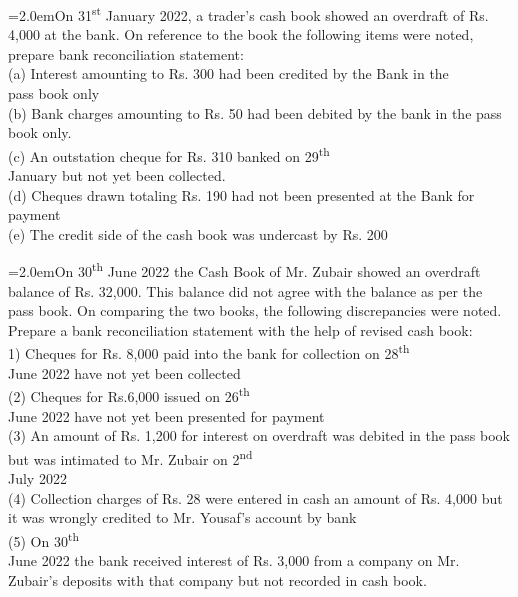 \documentclass[11pt,a4paper]{article}
\newcommand{\lqn}[2]{\Needspace{6\baselineskip}\par\medskip\noindent\hangindent=2.0em\hangafter=1\makebox[2.0em][l]{\textbf{#1.}}#2\par}
\begin{document}
\lqn{75}{On 31\textsuperscript{st} January 2022, a trader's cash book showed an overdraft of Rs. 4,000 at the bank. On reference to the book the following items were noted, prepare bank reconciliation statement:\\
(a) Interest amounting to Rs. 300 had been credited by the Bank in the\\
pass book only\\
(b) Bank charges amounting to Rs. 50 had been debited by the bank in the pass book only.\\
(c) An outstation cheque for Rs. 310 banked on 29\textsuperscript{th}\\
 January but not yet been collected.\\
(d) Cheques drawn totaling Rs. 190 had not been presented at the Bank for payment\\
(e) The credit side of the cash book was undercast by Rs. 200\par
}
\lqn{76}{On 30\textsuperscript{th} June 2022 the Cash Book of Mr. Zubair showed an overdraft balance of Rs. 32,000. This balance did not agree with the balance as per the pass book. On comparing the two books, the following discrepancies were noted. Prepare a bank reconciliation statement with the help of revised cash book:\\
1) Cheques for Rs. 8,000 paid into the bank for collection on 28\textsuperscript{th}\\
 June 2022 have not yet been collected\\
(2) Cheques for Rs.6,000 issued on 26\textsuperscript{th}\\
 June 2022 have not yet been presented for payment\\
(3) An amount of Rs. 1,200 for interest on overdraft was debited in the pass book but was intimated to Mr. Zubair on 2\textsuperscript{nd}\\
 July 2022\\
(4) Collection charges of Rs. 28 were entered in cash an amount of Rs. 4,000 but it was wrongly credited to Mr. Yousaf's account by bank\\
(5) On 30\textsuperscript{th}\\
 June 2022 the bank received interest of Rs. 3,000 from a company on Mr. Zubair's deposits with that company but not recorded in cash book.\par
}
\end{document}
